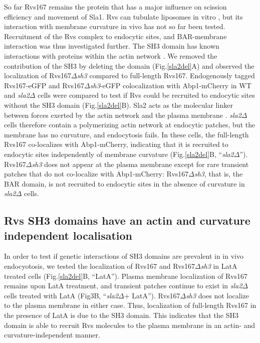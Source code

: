 \documentclass[9pt,lineno]{elife}
\begin{document}
So far Rvs167 remains the protein that has a major influence on scission efficiency and movement of Sla1. Rvs can tubulate liposomes in vitro \citep{Youn2010}, but its interaction with membrane curvature in vivo has not so far been tested.  Recruitment of the Rvs complex to endocytic sites, and BAR-membrane interaction was thus investigated further. The SH3 domain has known interactions with proteins within the actin network \citep{Lila1997,Colwill1999,Madania1999,Liu2009}. We removed the contribution of the SH3 by deleting the domain (Fig.\ref{sla2del}A) and observed the localization of Rvs167\textit{$\Delta$sh3} compared to full-length Rvs167. Endogenously tagged Rvs167-eGFP and Rvs167\textit{$\Delta$sh3}-eGFP colocalization with Abp1-mCherry in WT and \textit{sla2$\Delta$} cells were compared to test if Rvs could be recruited to endocytic sites without the SH3 domain (Fig.\ref{sla2del}B). Sla2 acts as the molecular linker between forces exerted by the actin network and the plasma membrane \citep{Skruzny2012}. \textit{sla2$\Delta$} cells therefore contain a polymerizing actin network at endocytic patches, but the membrane has no curvature, and endocytosis fails. In these cells, the full-length Rvs167 co-localizes with Abp1-mCherry, indicating that it is recruited to endocytic sites independently of membrane curvature (Fig.\ref{sla2del}B, “\textit{sla2$\Delta$}”). Rvs167\textit{$\Delta$sh3} does not appear at the plasma membrane except for rare transient patches that do not co-localize with Abp1-mCherry: Rvs167\textit{$\Delta$sh3}, that is, the BAR domain, is not recruited to endocytic sites in the absence of curvature in \textit{sla2$\Delta$} cells.


\subsection{Rvs SH3 domains have an actin and curvature independent localisation}
In order to test if genetic interactions of SH3 domains are prevalent in in vivo endocyotosis, we tested the localization of Rvs167 and Rvs167\textit{$\Delta$sh3} in LatA treated cells (Fig.\ref{sla2del}B, “LatA”). Plasma membrane localization of Rvs167 remains upon LatA treatment, and transient patches continue to exist in \textit{sla2$\Delta$} cells treated with LatA (Fig3B, “\textit{sla2$\Delta$}+ LatA”). Rvs167\textit{$\Delta$sh3} does not localize to the plasma membrane in either case. Thus, localization of full-length Rvs167 in the presence of LatA is due to the SH3 domain. This indicates that the SH3 domain is able to recruit Rvs molecules to the plasma membrane in an actin- and curvature-independent manner. 
\end{document}
